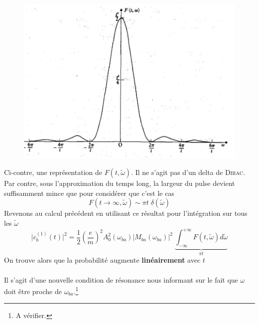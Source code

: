 	\begin{figure}
	\vspace{-5mm}
	\includegraphics[scale=0.4]{ch2/image1}
	\end{figure}
Ci-contre, une représentation de $F(t,\tilde{\omega})$. Il ne s'agit pas d'un delta de \textsc{Dirac}.
Par contre, sous l'approximation du temps long, la largeur du pulse devient suffisamment mince que
pour considérer que c'est le cas
\begin{equation}
F(t \rightarrow \infty, \tilde{\omega}) \sim \pi t \; \delta(\tilde{\omega})
\end{equation}
Revenons au calcul précédent en utilisant ce résultat pour l'intégration sur tous les
$\tilde{\omega}$
\begin{equation}
  \vert c_b^{(1)} (t) \vert ^2 = 
\frac{1}{2} \left( \frac{e}{m} \right) ^2
A_0^2 (\omega_{ba}) 
     \vert M_{ba} (\omega_{ba}) \vert ^2 \; 
\underbrace{\int_{-\infty}^{+\infty}
F(t, \tilde{\omega}) d \tilde{\omega}}_{\pi t}
\end{equation}
On trouve alors que la probabilité augmente \textbf{linéairement} avec $t$ \\

\ \\

Il s'agit d'une nouvelle condition de résonance nous informant sur le fait que $\omega$ doit
être proche de $\omega_{ba}$.\footnote{A vérifier.}

